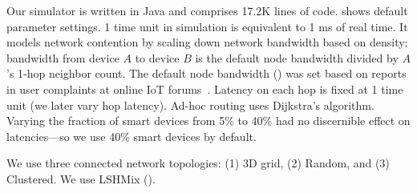 Our simulator is written in Java and comprises 17.2K lines of code.
 shows default parameter settings. {1 time unit in simulation is equivalent to 1 ms of real time. } 
It models network contention by scaling down network bandwidth based on density: bandwidth from device $A$ to device $B$ is the default node bandwidth divided by  $A$'s 1-hop neighbor count. The default node bandwidth () was set based on reports in user complaints at online IoT forums~\cite{google-nest-speed}.
Latency on each hop is fixed at 1 time unit
(we later vary hop latency). Ad-hoc routing uses Dijkstra's algorithm.
Varying the fraction of smart devices from 5\% to 40\% had no discernible effect on \kgroup{} latencies---so we use 40\% smart devices by default. 

We use three connected network topologies: (1) 3D grid, (2) Random, and (3) Clustered.
We use LSHMix (). 

